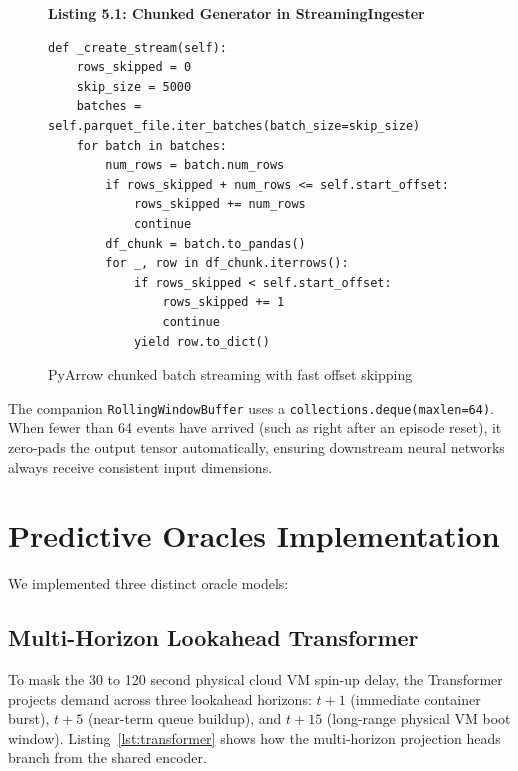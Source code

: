 \documentclass[12pt]{report}
\begin{document}
\begin{figure}[htbp]
\centering
\begin{minipage}{\linewidth}
\begin{framed}
\footnotesize
\textbf{Listing 5.1: Chunked Generator in StreamingIngester}
\begin{verbatim}
def _create_stream(self):
    rows_skipped = 0
    skip_size = 5000
    batches = self.parquet_file.iter_batches(batch_size=skip_size)
    for batch in batches:
        num_rows = batch.num_rows
        if rows_skipped + num_rows <= self.start_offset:
            rows_skipped += num_rows
            continue
        df_chunk = batch.to_pandas()
        for _, row in df_chunk.iterrows():
            if rows_skipped < self.start_offset:
                rows_skipped += 1
                continue
            yield row.to_dict()
\end{verbatim}
\end{framed}
\end{minipage}
\caption{PyArrow chunked batch streaming with fast offset skipping}
\label{lst:streaming}
\end{figure}

The companion \texttt{RollingWindowBuffer} uses a \texttt{collections.\allowbreak deque(maxlen=64)}. When fewer than 64 events have arrived (such as right after an episode reset), it zero-pads the output tensor automatically, ensuring downstream neural networks always receive consistent input dimensions.

\section{Predictive Oracles Implementation}

We implemented three distinct oracle models:

\subsection{Multi-Horizon Lookahead Transformer}
To mask the 30 to 120 second physical cloud VM spin-up delay, the Transformer projects demand across three lookahead horizons: $t+1$ (immediate container burst), $t+5$ (near-term queue buildup), and $t+15$ (long-range physical VM boot window). Listing~\ref{lst:transformer} shows how the multi-horizon projection heads branch from the shared encoder.
\end{document}
